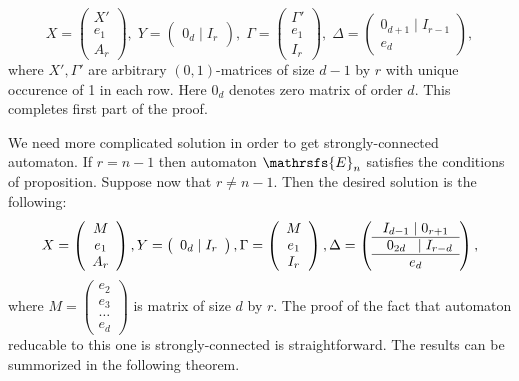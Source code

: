 \documentclass[11pt]{llncs}
\newcommand{\G}{\Gamma}
\newcommand{\D}{\Delta}
\begin{document}
$$
X =
\left(
\begin{array}{c}
X' \\
e_1 \\
A_r
\end{array}
\right),\;
Y = 
\left(
\begin{array}{c}
0_d \mid I_r
\end{array}
\right),\;
\G = 
\left(
\begin{array}{c}
\G' \\
e_1 \\
I_r
\end{array}
\right),\;
\D = 
\left(
\begin{array}{c}
0_{d + 1} \mid I_{r-1}\\ \hline
e_d
\end{array}
\right),
$$
where $X', \G'$ are arbitrary $(0,1)$-matrices of size $d-1$ by $r$ with unique occurence of 1
in each row. Here $0_{d}$ denotes zero matrix of order $d$. This completes first part of the proof.

We need more complicated solution in order to get strongly-connected automaton.
If $r = n - 1$ then automaton $\mathrsfs{E}_n$ satisfies the conditions of proposition.
Suppose now that $r \neq n - 1$.
Then the desired solution is the following:
$$
X =
\left(
\begin{array}{c}
M \\
e_1 \\
A_r
\end{array}
\right),
Y = 
\left(
\begin{array}{c}
0_d \mid I_r
\end{array}
\right),
\G = 
\left(
\begin{array}{c}
M \\
e_1 \\
I_r
\end{array}
\right),
\D = 
\left(
\begin{array}{c}
I_{d - 1} \mid 0_{r + 1} \\ \hline
\textbf{\,\,\,} 0_{2d} \textbf{\,\,\,} \mid I_{r - d} \\ \hline
e_d
\end{array}
\right),
$$
where $M =
\left(
\begin{smallmatrix}
e_2\\
e_3\\
\ldots\\
e_d
\end{smallmatrix}\right)$ is matrix of size $d$ by $r$.
The proof of the fact that automaton reducable to this one is strongly-connected is
straightforward. The results can be summorized in the following theorem.
\end{document}
